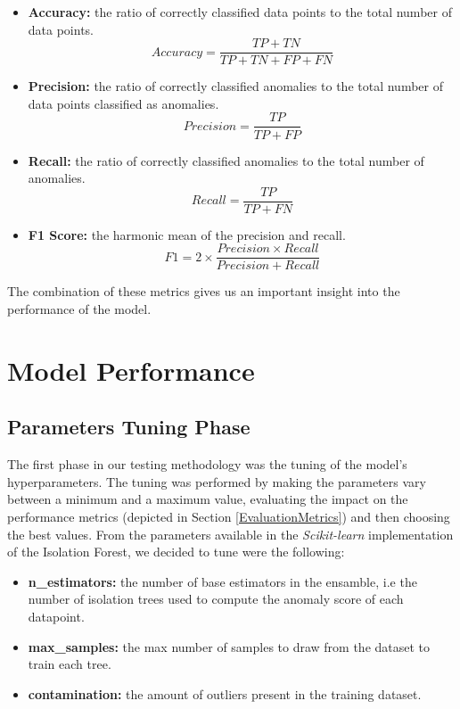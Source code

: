 \documentclass[futureinternet,article,submit,pdftex,moreauthors]{Definitions/mdpi}
\begin{document}
\begin{itemize}
	\item \textbf{Accuracy:} the ratio of correctly classified data points to the total number of data points.
	\begin{equation}
		\label{eq:accuracy}
	  Accuracy = \frac{TP + TN}{TP + TN + FP + FN}
	\end{equation}
	\item \textbf{Precision:} the ratio of correctly classified anomalies to the total number of data points classified as anomalies.
	\begin{equation}
		\label{eq:precision}
	  Precision = \frac{TP}{TP + FP}
	\end{equation}
	\item \textbf{Recall:} the ratio of correctly classified anomalies to the total number of anomalies.
	\begin{equation}
		\label{eq:recall}
	  Recall = \frac{TP}{TP + FN}
	\end{equation}
	\item \textbf{F1 Score:} the harmonic mean of the precision and recall.
	\begin{equation}
		\label{eq:f1}
	  F1 = 2 \times \frac{Precision \times Recall}{Precision + Recall}
	\end{equation}
\end{itemize}

The combination of these metrics gives us an important insight into the performance of the model. 

\section{Model Performance }

\subsection{Parameters Tuning Phase}

The first phase in our testing methodology was the tuning of the model's hyperparameters. The tuning was performed by making the parameters vary between a minimum and a maximum value, evaluating the impact on the performance metrics (depicted in Section \ref{EvaluationMetrics}) and then choosing the best values.
From the parameters available in the \textit{Scikit-learn} implementation of the Isolation Forest, we decided to tune were the following: 

\begin{itemize}
	\item \textbf{n\_estimators:} the number of base estimators in the ensamble, i.e the number of isolation trees used to compute the anomaly score of each datapoint. 
	\item \textbf{max\_samples:} the max number of samples to draw from the dataset to train each tree.
	\item \textbf{contamination:} the amount of outliers present in the training dataset.  
\end{itemize}
\end{document}
